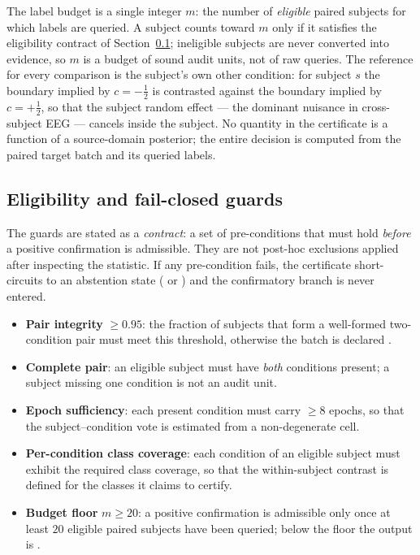 The label budget is a single integer $m$: the number of \emph{eligible} paired subjects for which labels are
queried. A subject counts toward $m$ only if it satisfies the eligibility contract of
Section~\ref{sec:b3-guards}; ineligible subjects are never converted into evidence, so $m$ is a budget of
sound audit units, not of raw queries. The reference for every comparison is the subject's own other
condition: for subject $s$ the boundary implied by $c=-\tfrac12$ is contrasted against the boundary implied
by $c=+\tfrac12$, so that the subject random effect --- the dominant nuisance in cross-subject EEG --- cancels
inside the subject. No quantity in the certificate is a function of a source-domain posterior; the entire
decision is computed from the paired target batch and its queried labels.

\subsection{Eligibility and fail-closed guards}
\label{sec:b3-guards}
The guards are stated as a \emph{contract}: a set of pre-conditions that must hold \emph{before} a positive
confirmation is admissible. They are not post-hoc exclusions applied after inspecting the statistic. If any
pre-condition fails, the certificate short-circuits to an abstention state
(\stneed{} or \stinv{}) and the confirmatory branch is never entered.

\begin{itemize}
  \item \textbf{Pair integrity} $\geq 0.95$: the fraction of subjects that form a well-formed two-condition
        pair must meet this threshold, otherwise the batch is declared \stinv{}.
  \item \textbf{Complete pair}: an eligible subject must have \emph{both} conditions present; a subject
        missing one condition is not an audit unit.
  \item \textbf{Epoch sufficiency}: each present condition must carry $\geq 8$ epochs, so that the
        subject--condition vote is estimated from a non-degenerate cell.
  \item \textbf{Per-condition class coverage}: each condition of an eligible subject must exhibit the
        required class coverage, so that the within-subject contrast is defined for the classes it claims to
        certify.
  \item \textbf{Budget floor} $m\geq 20$: a positive confirmation is admissible only once at least $20$
        eligible paired subjects have been queried; below the floor the output is \stneed{}.
\end{itemize}

